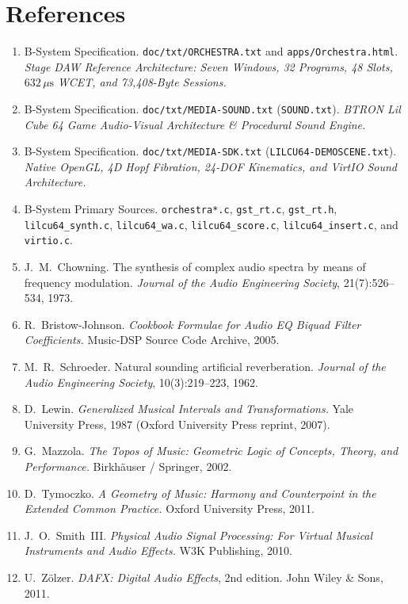 \chapter{References}
\label{app:references}

\begin{enumerate}[leftmargin=1.5em]
  \item B-System Specification. \texttt{doc/txt/ORCHESTRA.txt} and \texttt{apps/Orchestra.html}. \emph{Stage DAW Reference Architecture: Seven Windows, 32 Programs, 48 Slots, $632\,\mu\text{s}$ WCET, and 73,408-Byte Sessions.}
  \item B-System Specification. \texttt{doc/txt/MEDIA-SOUND.txt} (\texttt{SOUND.txt}). \emph{BTRON Lil Cube 64 Game Audio-Visual Architecture \& Procedural Sound Engine.}
  \item B-System Specification. \texttt{doc/txt/MEDIA-SDK.txt} (\texttt{LILCU64-DEMOSCENE.txt}). \emph{Native OpenGL, 4D Hopf Fibration, 24-DOF Kinematics, and VirtIO Sound Architecture.}
  \item B-System Primary Sources. \texttt{orchestra*.c}, \texttt{gst\_rt.c}, \texttt{gst\_rt.h}, \texttt{lilcu64\_synth.c}, \texttt{lilcu64\_wa.c}, \texttt{lilcu64\_score.c}, \texttt{lilcu64\_insert.c}, and \texttt{virtio.c}.
  \item J.~M.~Chowning. The synthesis of complex audio spectra by means of frequency modulation. \emph{Journal of the Audio Engineering Society}, 21(7):526--534, 1973.
  \item R.~Bristow-Johnson. \emph{Cookbook Formulae for Audio EQ Biquad Filter Coefficients.} Music-DSP Source Code Archive, 2005.
  \item M.~R.~Schroeder. Natural sounding artificial reverberation. \emph{Journal of the Audio Engineering Society}, 10(3):219--223, 1962.
  \item D.~Lewin. \emph{Generalized Musical Intervals and Transformations.} Yale University Press, 1987 (Oxford University Press reprint, 2007).
  \item G.~Mazzola. \emph{The Topos of Music: Geometric Logic of Concepts, Theory, and Performance.} Birkh\"auser / Springer, 2002.
  \item D.~Tymoczko. \emph{A Geometry of Music: Harmony and Counterpoint in the Extended Common Practice.} Oxford University Press, 2011.
  \item J.~O.~Smith~III. \emph{Physical Audio Signal Processing: For Virtual Musical Instruments and Audio Effects.} W3K Publishing, 2010.
  \item U.~Z\"olzer. \emph{DAFX: Digital Audio Effects}, 2nd edition. John Wiley \& Sons, 2011.

\end{enumerate}
